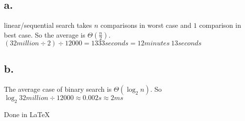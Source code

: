 \documentclass{article}%
\begin{document}
\subsection{a.}
linear/sequential search takes $n$ comparisons in worst case and $1$ comparison in best case. So the average is $\Theta(\frac{n}{2})$. $(32million \div 2)\div 12000 = 1333seconds = 12minutes\ 13seconds$

\subsection{b.}
The average case of binary search is $\Theta(\log_2 n)$. So $\log_2 32million \div 12000 \approx 0.002s \approx 2ms$
\clearpage

\vspace*{0.5in}
\noindent Done in LaTeX
\end{document}
